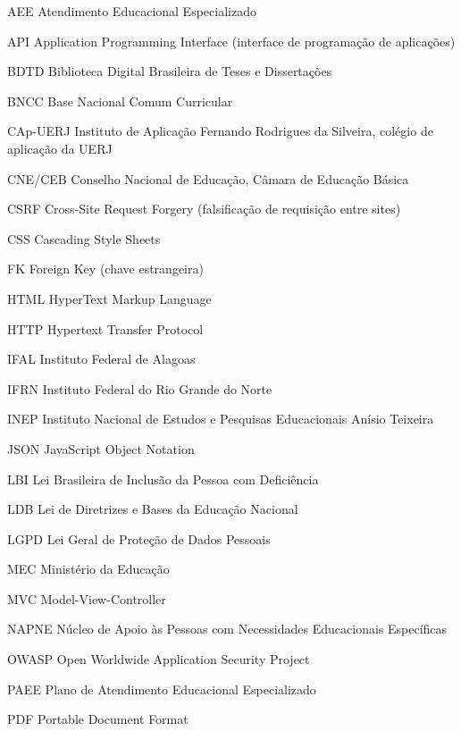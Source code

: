 
\begin{siglas}
  \item[AEE] Atendimento Educacional Especializado
  \item[API] Application Programming Interface (interface de programação de aplicações)
  \item[BDTD] Biblioteca Digital Brasileira de Teses e Dissertações
  \item[BNCC] Base Nacional Comum Curricular
  \item[CAp-UERJ] Instituto de Aplicação Fernando Rodrigues da Silveira, colégio de aplicação da UERJ
  \item[CNE/CEB] Conselho Nacional de Educação, Câmara de Educação Básica
  \item[CSRF] Cross-Site Request Forgery (falsificação de requisição entre sites)
  \item[CSS] Cascading Style Sheets
  \item[FK] Foreign Key (chave estrangeira)
  \item[HTML] HyperText Markup Language
  \item[HTTP] Hypertext Transfer Protocol
  \item[IFAL] Instituto Federal de Alagoas
  \item[IFRN] Instituto Federal do Rio Grande do Norte
  \item[INEP] Instituto Nacional de Estudos e Pesquisas Educacionais Anísio Teixeira
  \item[JSON] JavaScript Object Notation
  \item[LBI] Lei Brasileira de Inclusão da Pessoa com Deficiência
  \item[LDB] Lei de Diretrizes e Bases da Educação Nacional
  \item[LGPD] Lei Geral de Proteção de Dados Pessoais
  \item[MEC] Ministério da Educação
  \item[MVC] Model-View-Controller
  \item[NAPNE] Núcleo de Apoio às Pessoas com Necessidades Educacionais Específicas
  \item[OWASP] Open Worldwide Application Security Project
  \item[PAEE] Plano de Atendimento Educacional Especializado
  \item[PDF] Portable Document Format

\end{siglas}
